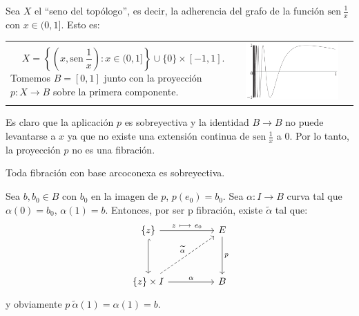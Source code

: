 \begin{ejem}
Sea $X$ el ``seno del topólogo'', es decir, la adherencia del grafo de la función $\text{sen}\: {\frac{1}{x}}$ con $x \in (0,1]$. Esto es: \par
\begin{tabular}{ll}
\begin{minipage}{0.5\textwidth}
\[ 
X = \left\lbrace \left(x, \text{sen}\: {\frac{1}{x}} \right) : x \in (0,1] \right\rbrace \cup \{0\} \times [-1,1] .
\]
Tomemos $B = [0,1]$ junto con la proyección $p : X \longrightarrow B$  sobre la primera componente. \par
\end{minipage}
&
\begin{minipage}{0.5\textwidth}
\centering
\includegraphics[width =0.9\textwidth]{images/senotop}
\end{minipage}
\end{tabular}


Es claro que la aplicación $p$ es sobreyectiva y la identidad $B \longrightarrow B$ no puede levantarse a $x$ ya que no existe una extensión continua de $\text{sen}\: {\frac{1}{x}}$ a $0$. Por lo tanto, la proyección $p$ no es una fibración.
\end{ejem}
\begin{prop}
Toda fibración con base arcoconexa es sobreyectiva.
\end{prop}
\begin{demo}
Sea $b, b_0 \in B$ con $b_0$ en la imagen de $p$, $p(e_0) = b_0$. Sea $\alpha : I \longrightarrow B$ curva tal que $\alpha(0) = b_0$, $\alpha(1) = b$. Entonces, por ser p fibración, existe $\widetilde{\alpha}$ tal que:
\[
\begin{tikzcd}
\{z\} \arrow{rr}{z \ \longmapsto \ e_0} \arrow[hook]{dd} & & E \arrow{dd}{p} \\
\\
\{z\} \times I \arrow{rr}{\alpha} \arrow[dashed]{uurr}{\widetilde{\alpha}} & & B
\end{tikzcd}
\]
y obviamente $p \: \widetilde{\alpha}(1) = \alpha(1) = b$.
\end{demo}
